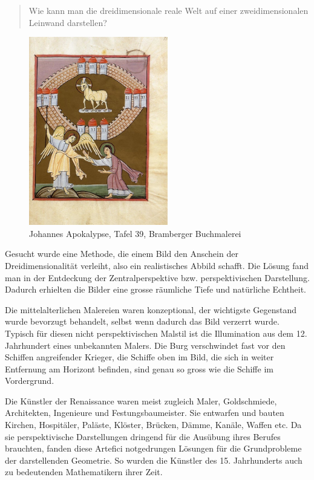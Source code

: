 \documentclass[%
11pt,%
twoside,%
titlepage,%
a4page,%
german,%
headsepline%
]{scrartcl}
\begin{document}
\begin{quote}
Wie kann man die dreidimensionale reale Welt auf einer zweidimensionalen Leinwand darstellen?
\end{quote}

\begin{figure}[h!]
\begin{center}
\includegraphics[width=0.54\textwidth]{pictures/tafel39}
\caption{Johannes Apokalypse, Tafel 39, Bramberger Buchmalerei}
\end{center}
\end{figure}

Gesucht wurde eine Methode, die einem Bild den Anschein der Dreidimensionalit\"at verleiht, also ein realistisches Abbild schafft. Die L\"osung fand man in der Entdeckung der Zentralperspektive bzw. perspektivischen Darstellung. Dadurch erhielten die Bilder eine grosse r\"aumliche Tiefe und nat\"urliche Echtheit.

Die mittelalterlichen Malereien waren \glqq konzeptional\grqq, der wichtigste Gegenstand wurde bevorzugt behandelt, selbst wenn dadurch das Bild verzerrt wurde. Typisch f\"ur diesen nicht perspektivischen Malstil ist die Illumination aus dem 12. Jahrhundert eines unbekannten Malers. Die Burg verschwindet fast vor den Schiffen angreifender Krieger, die Schiffe oben im Bild, die sich in weiter Entfernung am Horizont befinden, sind genau so gross wie die Schiffe im Vordergrund.

Die K\"unstler der Renaissance waren meist zugleich Maler, Goldschmiede, Architekten, Ingenieure und Festungsbaumeister. Sie entwarfen und bauten Kirchen, Hospit\"aler, Pal\"aste, Kl\"oster, Br\"ucken, D\"amme, Kan\"ale, Waffen etc. Da sie perspektivische Darstellungen dringend f\"ur die Aus\"ubung ihres Berufes brauchten, fanden diese Artefici notgedrungen L\"osungen f\"ur die Grundprobleme der darstellenden Geometrie. So wurden die K\"unstler des 15. Jahrhunderts auch zu bedeutenden Mathematikern ihrer Zeit.
\end{document}
